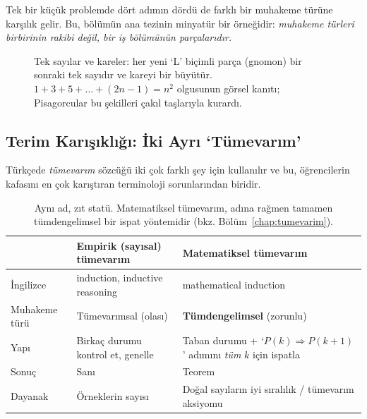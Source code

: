 Tek bir küçük problemde dört adımın dördü de farklı bir muhakeme türüne karşılık gelir. Bu, bölümün ana tezinin minyatür bir örneğidir: \emph{muhakeme türleri birbirinin rakibi değil, bir iş bölümünün parçalarıdır.}

\begin{figure}[h]
\centering
{}
\caption{Tek sayılar ve kareler: her yeni ‘L’ biçimli parça (gnomon) bir sonraki tek sayıdır ve kareyi bir büyütür. $1+3+5+\dots+(2n-1)=n^2$ olgusunun görsel kanıtı; Pisagorcular bu şekilleri çakıl taşlarıyla kurardı.}\label{fig:gnomon}
\end{figure}

\subsection{Terim Karışıklığı: İki Ayrı ‘Tümevarım’}

Türkçede \emph{tümevarım} sözcüğü iki çok farklı şey için kullanılır ve bu, öğrencilerin kafasını en çok karıştıran terminoloji sorunlarından biridir.

\begin{table}[h]
\centering\small
\renewcommand{\arraystretch}{1.35}
\begin{tabularx}{\linewidth}{>{\raggedright\arraybackslash}p{2.6cm}>{\raggedright\arraybackslash}X>{\raggedright\arraybackslash}X}
\toprule
 & \textbf{Empirik (sayısal) tümevarım} & \textbf{Matematiksel tümevarım}\\
\midrule
İngilizce & induction, inductive reasoning & mathematical induction\\
Muhakeme türü & Tümevarımsal (olası) & \textbf{Tümdengelimsel} (zorunlu)\\
Yapı & Birkaç durumu kontrol et, genelle & Taban durumu + ‘$P(k)\Rightarrow P(k+1)$’ adımını \emph{tüm} $k$ için ispatla\\
Sonuç & Sanı & Teorem\\
Dayanak & Örneklerin sayısı & Doğal sayıların iyi sıralılık / tümevarım aksiyomu\\
\bottomrule
\end{tabularx}
\caption{Aynı ad, zıt statü. Matematiksel tümevarım, adına rağmen tamamen tümdengelimsel bir ispat yöntemidir (bkz. Bölüm~\ref{chap:tumevarim}).}
\end{table}

